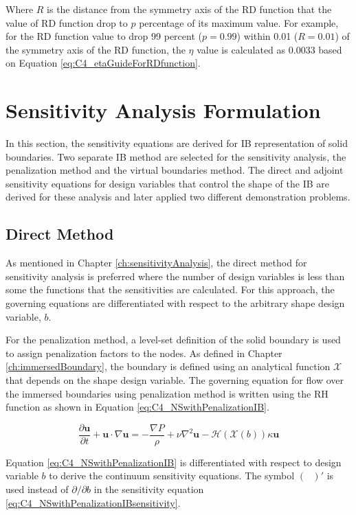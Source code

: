 Where $R$ is the distance from the symmetry axis of the RD function that the value of RD function drop to $p$ percentage of its maximum value. For example, for the RD function value to drop 99 percent ($p = 0.99$) within 0.01 ($R = 0.01$) of the symmetry axis of the RD function, the $\eta$ value is calculated as $0.0033$ based on Equation \eqref{eq:C4_etaGuideForRDfunction}.

\section{Sensitivity Analysis Formulation}
In this section, the sensitivity equations are derived for IB representation of solid boundaries. Two separate IB method are selected for the sensitivity analysis, the penalization method and the virtual boundaries method. The direct and adjoint sensitivity equations for design variables that control the shape of the IB are derived for these analysis and later applied two different demonstration problems. 

\subsection{Direct Method}
As mentioned in Chapter \ref{ch:sensitivityAnalysis}, the direct method for sensitivity analysis is preferred where the number of design variables is less than some the functions that the sensitivities are calculated. For this approach, the governing equations are differentiated with respect to the arbitrary shape design variable, $b$.

For the penalization method, a level-set definition of the solid boundary is used to assign penalization factors to the nodes. As defined in Chapter \ref{ch:immersedBoundary}, the boundary is defined using an analytical function $\mathcal{X}$ that depends on the shape design variable. The governing equation for flow over the immersed boundaries using penalization method is written using the RH function as shown in Equation \eqref{eq:C4_NSwithPenalizationIB}.

\begin{equation}\label{eq:C4_NSwithPenalizationIB}
    \frac{\partial \mathbf{u}}{\partial t} + \mathbf{u} \cdot \nabla \mathbf{u} = 
    -\frac{\nabla P}{\rho} + \nu \nabla^2 \mathbf{u} -\mathcal{H}(\mathcal{X}(b)) \kappa \mathbf{u}
\end{equation}

Equation \eqref{eq:C4_NSwithPenalizationIB} is differentiated with respect to design variable $b$ to derive the continuum sensitivity equations. The symbol $(\text{ })'$ is used instead of $\partial /\partial b$ in the sensitivity equation \eqref{eq:C4_NSwithPenalizationIBsensitivity}.

